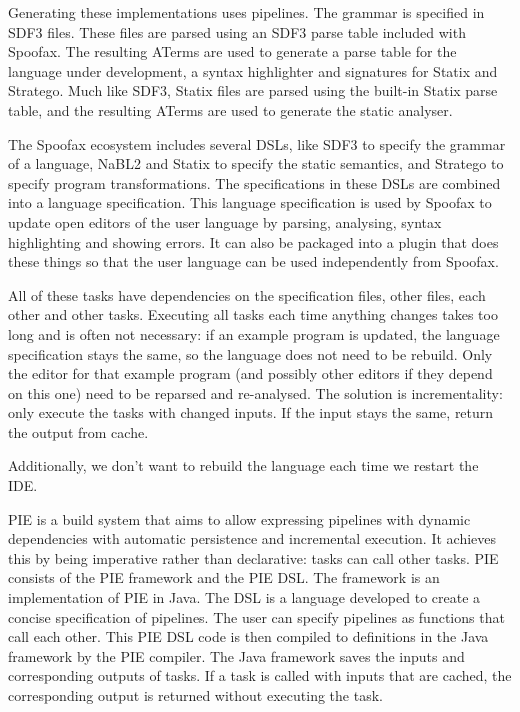 Generating these implementations uses pipelines.
The grammar is specified in SDF3 files.
These files are parsed using an SDF3 parse table included with Spoofax.
The resulting ATerms are used to generate a parse table for the language under development, a syntax highlighter and signatures for Statix and Stratego.
Much like SDF3, Statix files are parsed using the built-in Statix parse table, and the resulting ATerms are used to generate the static analyser.




The Spoofax ecosystem includes several DSLs, like SDF3 to specify the grammar of a language, NaBL2 and Statix to specify the static semantics, and Stratego to specify program transformations. 
The specifications in these DSLs are combined into a language specification.
This language specification is used by Spoofax to update open editors of the user language by parsing, analysing, syntax highlighting and showing errors.
It can also be packaged into a plugin that does these things so that the user language can be used independently from Spoofax.

All of these tasks have dependencies on the specification files, other files, each other and other tasks.
Executing all tasks each time anything changes takes too long and is often not necessary: if an example program is updated, the language specification stays the same, so the language does not need to be rebuild.
Only the editor for that example program (and possibly other editors if they depend on this one) need to be reparsed and re-analysed.
The solution is incrementality: only execute the tasks with changed inputs.
If the input stays the same, return the output from cache.

Additionally, we don't want to rebuild the language each time we restart the IDE.


\Ac{PIE} is a build system that aims to allow expressing pipelines with dynamic dependencies with automatic persistence and incremental execution.
It achieves this by being imperative rather than declarative: tasks can call other tasks.
\Ac{PIE} consists of the PIE framework and the \ac{PIE} \ac{DSL}.
The framework is an implementation of \ac{PIE} in Java.
The \ac{DSL} is a language developed to create a concise specification of pipelines.
The user can specify pipelines as functions that call each other.
This \ac{PIE} \ac{DSL} code is then compiled to definitions in the Java framework by the \ac{PIE} compiler.
The Java framework saves the inputs and corresponding outputs of tasks.
If a task is called with inputs that are cached, the corresponding output is returned without executing the task.

